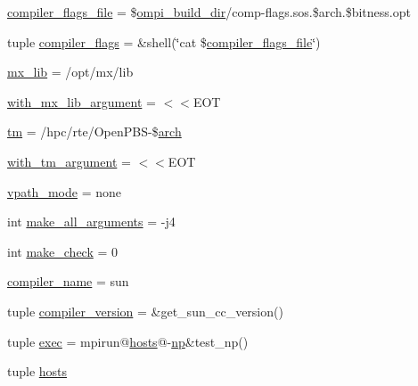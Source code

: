 \begin{DoxyCompactItemize}
\item 
\hyperlink{namespaceompi-core-template_aa07e281cdd8bbbdaa204857ffbffea46}{compiler\-\_\-flags\-\_\-file} = \$\hyperlink{namespaceompi-core-template_a16792dcf7471cfb9371e3866e5b29bda}{ompi\-\_\-build\-\_\-dir}/comp-\/flags.\-sos.\$arch.\$bitness.\-opt
\item 
tuple \hyperlink{namespaceompi-core-template_a5b2489e93c91084486e1d16ae13723b8}{compiler\-\_\-flags} = \&shell(\char`\"{}cat \$\hyperlink{namespaceompi-core-template_aa07e281cdd8bbbdaa204857ffbffea46}{compiler\-\_\-flags\-\_\-file}\char`\"{})
\item 
\hyperlink{namespaceompi-core-template_ad39b6930be020ebedb6e85a5fa1d6602}{mx\-\_\-lib} = /opt/mx/lib
\item 
\hyperlink{namespaceompi-core-template_a961a3e9f58483894d366809baf236a0f}{with\-\_\-mx\-\_\-lib\-\_\-argument} = $<$$<$E\-O\-T
\item 
\hyperlink{namespaceompi-core-template_a33bc188e781bcf5335e314bb324499c4}{tm} = /hpc/rte/Open\-P\-B\-S-\/\$\hyperlink{namespaceompi-core-template_a710dd59a52ca88aad0a440a9d78a386c}{arch}
\item 
\hyperlink{namespaceompi-core-template_a99715f0b797884f5eb56ad57c31d3498}{with\-\_\-tm\-\_\-argument} = $<$$<$E\-O\-T
\item 
\hyperlink{namespaceompi-core-template_a9cc0911af42525eed84ffc2ecf620987}{vpath\-\_\-mode} = none
\item 
int \hyperlink{namespaceompi-core-template_a7e4e240833589ea0dd76624fe36aa7ed}{make\-\_\-all\-\_\-arguments} = -\/j4
\item 
int \hyperlink{namespaceompi-core-template_af74a20b172057ad9db8c98040d6695ab}{make\-\_\-check} = 0
\item 
\hyperlink{namespaceompi-core-template_a5b83ee824af44e042ab01020557d1718}{compiler\-\_\-name} = sun
\item 
tuple \hyperlink{namespaceompi-core-template_a7cee2f24a23de4deacdb5e9b2ac629de}{compiler\-\_\-version} = \&get\-\_\-sun\-\_\-cc\-\_\-version()
\item 
tuple \hyperlink{namespaceompi-core-template_a053976d8fb6135592c6990fd3f75537a}{exec} = mpirun@\hyperlink{namespaceompi-core-template_a07fe97780730a6b76bec87d365cc8bd6}{hosts}@-\/\hyperlink{namespaceompi-core-template_ac85b4df29f7ac381e1c6144e628e0027}{np}\&test\-\_\-np()
\item 
tuple \hyperlink{namespaceompi-core-template_a07fe97780730a6b76bec87d365cc8bd6}{hosts}
\item 

\end{DoxyCompactItemize}
